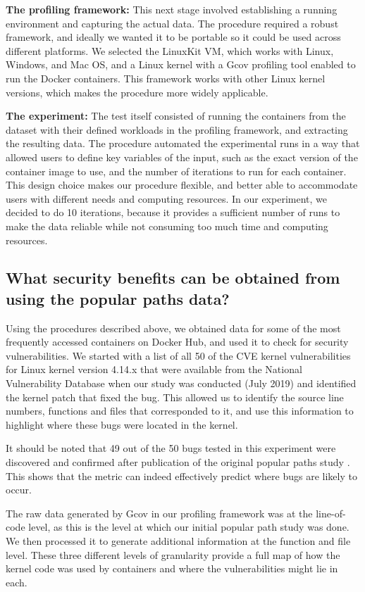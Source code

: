 \textbf{The profiling framework:} This next stage involved establishing a running environment and capturing the actual data. 
The procedure required a robust framework, and ideally we wanted it to be portable so it could be used across different platforms. We selected the LinuxKit VM, 
which works with Linux, Windows, and Mac OS, and a Linux kernel with a Gcov profiling tool enabled to run the Docker containers. 
This framework works with  other Linux kernel versions, which makes the procedure more widely applicable. 

\textbf{The experiment:} The test itself consisted of running the containers from the dataset with their defined workloads in the profiling framework, and extracting the resulting data. 
The procedure automated the experimental runs in a way that allowed users to define key variables of the input, such as the exact version of the container image to use, 
and the number of iterations to run for each container. This design choice makes our procedure flexible, and better able to accommodate users with different needs 
and computing resources. In our experiment, we decided to do 10 iterations, 
because it provides a sufficient number of runs to make the data reliable while not consuming too much time and computing resources. 

\subsection{What security benefits can be obtained from using the popular paths data?}
\label{sec.evaluation.2} 
Using the procedures described above, we obtained data for some of the most frequently accessed  containers on Docker Hub, and used it to check  for security vulnerabilities. 
We started with a list of all 50 of the CVE kernel vulnerabilities for Linux kernel version 4.14.x that were available from the National Vulnerability Database 
when our study was conducted (July 2019) \cite{NVD} and identified the kernel patch that fixed the bug. 
This allowed us to identify the source line numbers, functions and files that corresponded to it, and use this information to highlight where these bugs were located in the kernel.  

It should be noted that 49 out of the 50 bugs tested in this experiment were discovered and confirmed after publication of the original popular paths study \cite{Lock-in-Pop}. 
This shows that the metric can indeed effectively predict where bugs are likely to occur. 

The raw data generated by Gcov in our profiling framework was at the line-of-code level, as this is the level at which our initial popular path study was done. 
We then processed it to generate  additional information at the function and file level. 
These three different levels of granularity provide a full map of how the kernel code was used by containers and where the vulnerabilities might lie in each.

